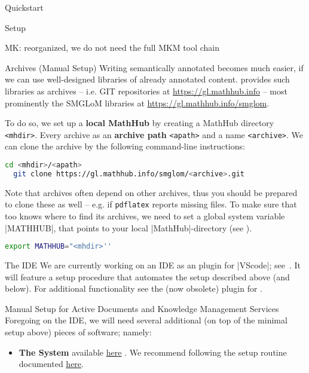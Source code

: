 \begin{sfragment}{Quickstart}
\begin{sfragment}{Setup}
\begin{newpart}{MK: reorganized, we do not need the full MKM tool chain}
      \begin{sfragment}[id=sec.stex-archives]{\sTeX Archives (Manual Setup)}
        Writing semantically annotated \sTeX becomes much easier, if we can use
        well-designed libraries of already annotated content. \sTeX provides such
        libraries as \sTeX archives -- i.e. GIT repositories at
        \url{https://gl.mathhub.info} -- most prominently the SMGLoM libraries at
        \url{https://gl.mathhub.info/smglom}.

        To do so, we set up a \textbf{local MathHub} by creating a MathHub directory
        \lstinline|<mhdir>|. Every \sTeX archive as an \textbf{archive path}
        \lstinline|<apath>| and a name \lstinline|<archive>|. We can clone the \sTeX
        archive by the following command-line instructions: 
\begin{lstlisting}[language=bash]
  cd <mhdir>/<apath>
  git clone https://gl.mathhub.info/smglom/<archive>.git
\end{lstlisting}
        Note that \sTeX archives often depend on other archives, thus you should be
        prepared to clone these as well -- e.g. if \texttt{pdflatex} reports missing
        files.  
        To make sure that \sTeX too knows where to find its archives, we need to set a global
        system variable |MATHHUB|, that points to your local |MathHub|-directory (see
        ).
\begin{lstlisting}[language=bash]
export MATHHUB="<mhdir>''
\end{lstlisting}
      \end{sfragment}
      
      \begin{sfragment}[id=sec.sTeX-IDE]{The \sTeX IDE}
        We are currently working on an \sTeX IDE as an \sTeX plugin for |VScode|;
        see~\cite{sTeX-IDE:on}. It will feature a setup procedure that automates the setup
        described above (and below). For additional functionality see the (now obsolete)
        plugin for  \cite{stexls:on,stexls-vscode-plugin:on}.
      \end{sfragment}
    \end{newpart}
    
  \begin{sfragment}{Manual Setup for Active Documents and Knowledge Management Services}
      Foregoing on the \sTeX IDE, we will need several additional (on top of the minimal
      setup above) pieces of software; namely:
      \begin{itemize}
        \item \textbf{The \mmt System} available
          \href{https://github.com/uniformal/MMT/tree/sTeX}{here}%
          . We recommend following
          the setup routine documented 
          \href{https://uniformal.github.io//doc/setup/}{here}.


\end{itemize}
\end{sfragment}
\end{sfragment}
\end{sfragment}
